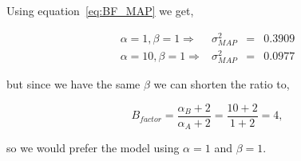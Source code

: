 \documentclass{article}
\begin{document}
Using equation~\eqref{eq:BF_MAP} we get,

\begin{equation}
\begin{array}{rrcl}
\alpha=1, \beta = 1 \Rightarrow & \sigma^2_{MAP} & = & 0.3909\\
\alpha=10, \beta = 1 \Rightarrow & \sigma^2_{MAP} & = &  0.0977
\end{array}
\end{equation}

but since we have the same $\beta$ we can shorten the ratio to,

\begin{equation}
B_{factor}=\frac{\alpha_B+2}{\alpha_A+2} = \frac{10+2}{1+2} = 4,
\end{equation}

so we would prefer the model using $\alpha=1$ and $\beta=1$.
\end{document}
